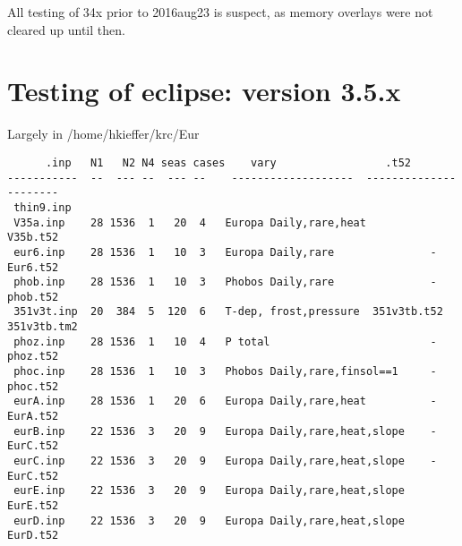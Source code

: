 \documentclass{article}
\begin{document}
All testing of 34x prior to 2016aug23 is suspect, as memory overlays were not
cleared up until then.
\section{Testing of eclipse: version 3.5.x}
Largely in /home/hkieffer/krc/Eur

\vspace{-3.mm} 
\begin{verbatim}
      .inp   N1   N2 N4 seas cases    vary                 .t52
-----------  --  --- --  --- --    -------------------  ----------------------
 thin9.inp   
 V35a.inp    28 1536  1   20  4   Europa Daily,rare,heat           V35b.t52
 eur6.inp    28 1536  1   10  3   Europa Daily,rare               -Eur6.t52  
 phob.inp    28 1536  1   10  3   Phobos Daily,rare               -phob.t52 
 351v3t.inp  20  384  5  120  6   T-dep, frost,pressure  351v3tb.t52 351v3tb.tm2
 phoz.inp    28 1536  1   10  4   P total                         -phoz.t52
 phoc.inp    28 1536  1   10  3   Phobos Daily,rare,finsol==1     -phoc.t52
 eurA.inp    28 1536  1   20  6   Europa Daily,rare,heat          -EurA.t52
 eurB.inp    22 1536  3   20  9   Europa Daily,rare,heat,slope    -EurC.t52
 eurC.inp    22 1536  3   20  9   Europa Daily,rare,heat,slope    -EurC.t52
 eurE.inp    22 1536  3   20  9   Europa Daily,rare,heat,slope     EurE.t52
 eurD.inp    22 1536  3   20  9   Europa Daily,rare,heat,slope     EurD.t52
\end{verbatim} 

\appendix %
\end{document}
